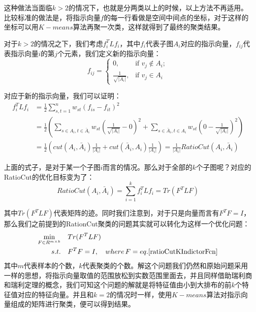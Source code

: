 \documentclass[UTF8, 12pt]{ctexart}
\begin{document}
这种做法当面临$k>2$的情况下，也就是分两类以上的时候，以上方法不再适用。比较标准的做法是，将指示向量$f$的每一行看做是空间中间点的坐标，对于这样的坐标可以用$K-means$算法再聚一次类，这样就得到了最终的聚类结果。

对于$k>2$的情况之下，我们考虑$f_i^TL{f_i}$，其中$f_{i}$代表子图$A_i$对应的指示向量，$f_{ij}$代表指示向量$i$的第$j$个元素，我们定义新的指示向量：
\begin{equation}
{f_{ij}} = \begin{cases}
0, & \text{if } {v_j} \notin A_i; \\
\frac{1}{{\sqrt {|{A_i}|} }}, & \text{if } {v_j} \in A_i
\end{cases}
\label{ratioCutKIndictorFcn}
\end{equation}

对应于新的指示向量，我们可以证明：
\begin{align}
	f_i^TL{f_i} & = \frac{1}{2}\sum\limits_{s,t = 1}^n {{w_{st}}{{({f_{is}} - {f_{it}})}^2}} \\
	& = \frac{1}{2}(\sum\limits_{s \in {A_i},t \in {{\bar A}_i}} {{w_{st}}{{(\frac{1}{{\sqrt {|{A_i}|} }} - 0)}^2}}  + \sum\limits_{s \in {{\bar A}_i},t \in {A_i}} {{w_{st}}{{(0 - \frac{1}{{\sqrt {|{A_i}|} }})}^2}} )\\
	& = \frac{1}{2}(cut({A_i},{{\bar A}_i})\frac{1}{{|{A_i}|}} + cut({{\bar A}_i},{A_i})\frac{1}{{|{A_i}|}}) = \frac{1}{|A_{i}|} RatioCut({A_i},{{\bar A}_i})
\end{align}


上面的式子，是对于某一个子图$i$而言的情况。那么对于全部的$k$个子图呢？对应的RatioCut的优化目标变为了：
\begin{equation}
RatioCut({A_i},{\bar A_i}) = \sum\limits_{i = 1}^k {f_i^TL{f_i}}  = Tr({F^T}LF)
\end{equation}

其中$Tr({F^T}LF)$代表矩阵的迹。同时我们注意到，对于只是向量而言有${F^T}F = I$，那么我们之前提到的RationCut聚类的问题其实就可以转化为这样一个优化问题：
\begin{align}
	\min_{F \in R^{m \times k}} & \quad Tr({F^T}LF) \\
	s.t. & \quad {F^T}F = I, \quad where \, F = eq. \ref{ratioCutKIndictorFcn}
\end{align}
其中$m$代表样本的个数，$k$代表聚类的个数。解这个问题我们仍然和原始问题采用一样的思想，将指示向量取值的范围放松到实数范围里面去，并且同样借助瑞利商和瑞利定理的概念，我们可知这个问题的解就是将特征值由小到大排布的前$k$个特征值对应的特征向量。并且和$k=2$的情况时一样，使用$K-means$算法对指示向量组成的矩阵进行聚类，便可以得到结果。
\end{document}
